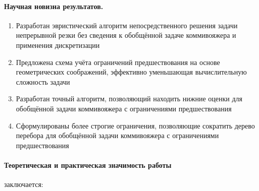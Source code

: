 \paragraph*{Научная новизна результатов.}

\begin{enumerate}
    \item
    Разработан эвристический алгоритм непосредственного решения
    задачи непрерывной резки без сведения к обобщённой
    задаче коммивояжера и применения дискретизации
    \item
    Предложена схема учёта ограничений предшествования на основе
    геометрических соображений,
    эффективно уменьшающая вычислительную сложность задачи
    \item
    Разработан точный алгоритм,
    позволяющий находить нижние оценки для
    обобщённой задачи коммивояжера с ограничениями предшествования
    \item
    Сформулированы более строгие ограничения,
    позволяющие сократить дерево перебора для обобщённой
    задачи коммивояжера с ограничениями предшествования
\end{enumerate}

\paragraph*{Теоретическая и практическая значимость работы} заключается:

